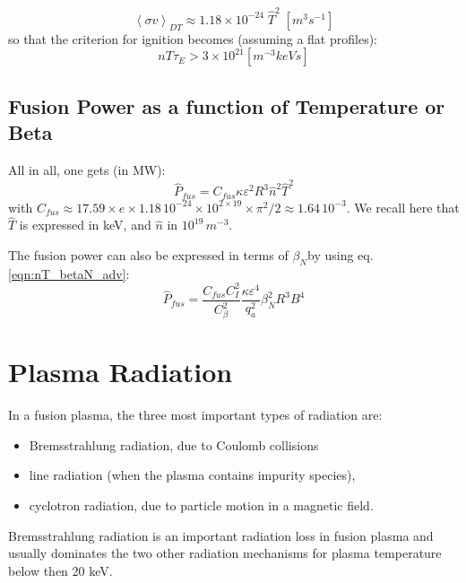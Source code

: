 \begin{equation}
\left< \sigma v \right>_{DT} 
\approx 
1.18 \times 10^{-24}\; \hat T^2 \;\left[\si{m^3 s^{-1}}\right]
\end{equation}
so that the criterion for ignition becomes (assuming a flat profiles): 
\begin{equation*}
    n T \tau_E > 3 \times 10^{21} \left[\si{m^{-3} keV s }\right]
\end{equation*}


\subsection{Fusion Power as a function of Temperature or Beta}
All in all, one gets (in MW):
\begin{equation}
\hat P_{fus} = C_{fus} \kappa \varepsilon^2 R^3 \hat n^2 \hat T^2  
\label{eq:DT_fusion_power}
\end{equation}
with $C_{fus} \approx 17.59 \times e\times 1.18\, 10^{-24} \times 10^{2\times19}\times \pi^2/2 \approx 1.64\, 10^{-3}$. We recall here that $\hat T$ is expressed in keV, and $\hat n$ in $10^{19} \, \si{m^{-3}}$. 


The fusion power can also be expressed in terms of $\beta_N$by using eq.\ref{eqn:nT_betaN_adv}:
\begin{equation}
\hat P_{fus} = \frac{C_{fus}C_I^2}{C_\beta^2} \frac{\kappa \varepsilon^4}{q_a^2} 
\beta_N^2 R^3 B^4 
\label{eq:DT_fusion_power_betaN}
\end{equation}



\section{Plasma Radiation}\label{sec:plasma_radiation}
In a fusion plasma, the three most important types of radiation are: 
\begin{itemize}
	\item Bremsstrahlung radiation, due to Coulomb collisions 
	\item line radiation (when the plasma contains impurity species), 
	\item cyclotron radiation, due to particle motion in a magnetic field.
\end{itemize}

Bremsstrahlung radiation is an important radiation loss in fusion plasma and usually dominates the two other radiation mechanisms for plasma temperature below then 20 keV. 



